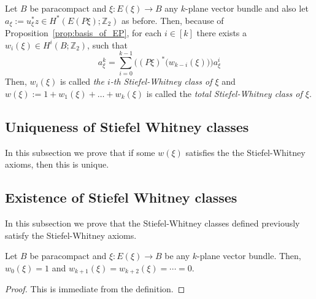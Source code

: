 \begin{definition}\label{def:SW} Let $B$ be paracompact and $\xi:E(\xi)\to B$ any $k$-plane vector bundle and also let $a_{\xi}:=u_{\xi}^*z\in H^*(E(P\xi);\mathbb{Z}_2)$ as before. Then, because of Proposition~\ref{prop:basis_of_EP}, for each $i\in[k]$ there exists a $w_i(\xi)\in H^i(B;\mathbb{Z}_2)$, such that
\[a_{\xi}^k=\sum_{i=0}^{k-1}\Big((P\xi)^*\big(w_{k-i}(\xi)\big)\Big)a_{\xi}^i\]
Then, $w_i(\xi)$ is called \emph{the $i$-th Stiefel-Whitney class of $\xi$} and $w(\xi):=1+w_1(\xi)+\ldots+w_k(\xi)$ is called the \emph{total Stiefel-Whitney class of $\xi$}.
\end{definition}

\subsection{Uniqueness of Stiefel Whitney classes}
In this subsection we prove that if some $w(\xi)$ satisfies the the Stiefel-Whitney axioms, then this is unique.



\subsection{Existence of Stiefel Whitney classes}
In this subsection we prove that the Stiefel-Whitney classes defined previously satisfy the Stiefel-Whitney axioms.
\begin{proposition} Let $B$ be paracompact and $\xi:E(\xi)\to B$ be any $k$-plane vector bundle. Then, $w_0(\xi)=1$ and $w_{k+1}(\xi)=w_{k+2}(\xi)=\cdots=0$.
\end{proposition}
\begin{proof} This is immediate from the definition.
\end{proof}

